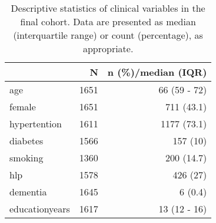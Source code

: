 \begin{table}
\caption{Descriptive statistics of clinical variables in the final cohort. Data are presented as median (interquartile range) or count (percentage), as appropriate.}
\centering
\begin{tabular}[t]{l|r|r}
\hline
 & N & n (\%)/median (IQR)\\
\hline
age & 1651 & 66 (59 - 72)\\
\hline
female & 1651 & 711 (43.1)\\
\hline
hypertention & 1611 & 1177 (73.1)\\
\hline
diabetes & 1566 & 157 (10)\\
\hline
smoking & 1360 & 200 (14.7)\\
\hline
hlp & 1578 & 426 (27)\\
\hline
dementia & 1645 & 6 (0.4)\\
\hline
educationyears & 1617 & 13 (12 - 16)\\
\hline
\end{tabular}
\end{table}
